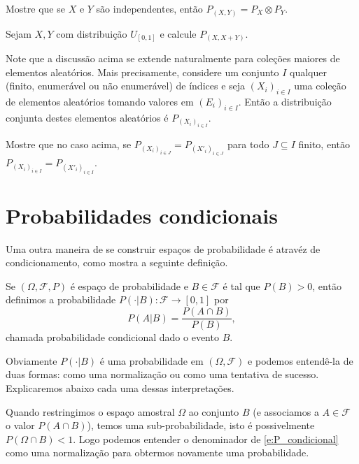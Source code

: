 \begin{exercise}
  Mostre que se $X$ e $Y$ são independentes, então $P_{(X,Y)} = P_X \otimes P_Y$.
\end{exercise}

\begin{exercise}
  Sejam $X, Y$ \iid com distribuição $U_{[0,1]}$ e calcule $P_{(X, X + Y)}$.
\end{exercise}

Note que a discussão acima se extende naturalmente para coleções maiores de elementos aleatórios.
Mais precisamente, considere um conjunto $I$ qualquer (finito, enumerável ou não enumerável) de índices e seja $(X_i)_{i \in I}$ uma coleção de elementos aleatórios tomando valores em $(E_i)_{i \in I}$.
Então a distribuição conjunta destes elementos aleatórios é $P_{(X_i)_{i \in I}}$.

\begin{exercise}
  Mostre que no caso acima, se $P_{(X_i)_{i \in J}} = P_{(X'_i)_{i \in J}}$ para todo $J \subseteq I$ finito, então $P_{(X_i)_{i \in I}} = P_{(X'_i)_{i \in I}}$.
\end{exercise}

\section{Probabilidades condicionais}

Uma outra maneira de se construir espaços de probabilidade é atravéz de condicionamento, como mostra a seguinte definição.
\begin{definition}
  Se $(\Omega, \mathcal{F}, P)$ é espaço de probabilidade e $B \in \mathcal{F}$ é tal que $P(B) > 0$, então definimos a probabilidade  $P(\cdot | B): \mathcal{F} \to [0,1]$ por
  \begin{equation}
    \label{e:P_condicional}
    P(A | B) = \frac{P(A \cap B)}{P(B)},
  \end{equation}
  chamada probabilidade condicional dado o evento $B$.
\end{definition}

Obviamente $P(\cdot | B)$ é uma probabilidade em $(\Omega, \mathcal{F})$ e podemos entendê-la de duas formas: como uma normalização ou como uma tentativa de sucesso.
Explicaremos abaixo cada uma dessas interpretações.

Quando restringimos o espaço amostral $\Omega$ ao conjunto $B$ (e associamos a $A \in \mathcal{F}$ o valor $P(A \cap B)$), temos uma sub-probabilidade, isto é possivelmente $P(\Omega \cap B) < 1$.
Logo podemos entender o denominador de \eqref{e:P_condicional} como uma normalização para obtermos novamente uma probabilidade.

